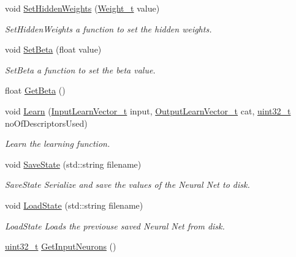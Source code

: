 \begin{DoxyCompactItemize}
void \hyperlink{class_soil_math_1_1_n_n_a8465f4fd2aebe181601c4be31df47ffd}{Set\+Hidden\+Weights} (\hyperlink{_soil_math_types_8h_ac56ad2b88186620fd0de0d213aa715dd}{Weight\+\_\+t} value)
\begin{DoxyCompactList}\small\item\em Set\+Hidden\+Weights a function to set the hidden weights. \end{DoxyCompactList}\item 
void \hyperlink{class_soil_math_1_1_n_n_a5a73fdf65b39d81b6185de3a3b315cdb}{Set\+Beta} (float value)
\begin{DoxyCompactList}\small\item\em Set\+Beta a function to set the beta value. \end{DoxyCompactList}\item 
float \hyperlink{class_soil_math_1_1_n_n_a636ce6a7a04b4e39b393a25530490c35}{Get\+Beta} ()
\item 
void \hyperlink{class_soil_math_1_1_n_n_a8550b524ed096712bb2fad9fa57b8c8d}{Learn} (\hyperlink{_soil_math_types_8h_a45aa81992bf0ddf272907bd4fa0b96cf}{Input\+Learn\+Vector\+\_\+t} input, \hyperlink{_soil_math_types_8h_a2d8b5a261688166d724b68addd8561e6}{Output\+Learn\+Vector\+\_\+t} cat, \hyperlink{_soil_math_types_8h_a435d1572bf3f880d55459d9805097f62}{uint32\+\_\+t} no\+Of\+Descriptors\+Used)
\begin{DoxyCompactList}\small\item\em Learn the learning function. \end{DoxyCompactList}\item 
void \hyperlink{class_soil_math_1_1_n_n_a970fda7e79dd4c34f2c3be69afaf4742}{Save\+State} (std\+::string filename)
\begin{DoxyCompactList}\small\item\em Save\+State Serialize and save the values of the Neural Net to disk. \end{DoxyCompactList}\item 
void \hyperlink{class_soil_math_1_1_n_n_aaa63195dc11ca8c02f3ce044a5d086b5}{Load\+State} (std\+::string filename)
\begin{DoxyCompactList}\small\item\em Load\+State Loads the previouse saved Neural Net from disk. \end{DoxyCompactList}\item 
\hyperlink{_soil_math_types_8h_a435d1572bf3f880d55459d9805097f62}{uint32\+\_\+t} \hyperlink{class_soil_math_1_1_n_n_a747371e8a53d1dd498e3f56c2ecece15}{Get\+Input\+Neurons} ()

\end{DoxyCompactItemize}
